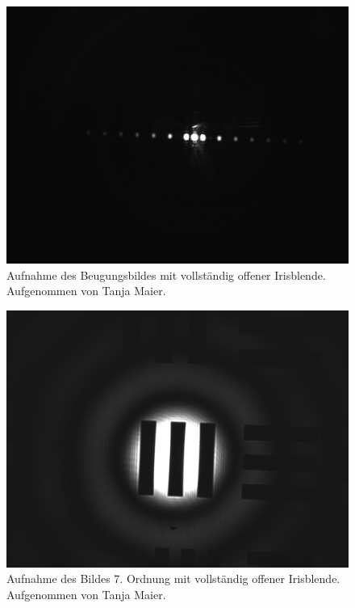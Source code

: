 \documentclass{article}
\begin{document}
\begin{minipage}[t]{.45\textwidth}
\begin{figure}[H]
\includegraphics[scale=0.1]{tm/Beugungsbild_voll.jpg}
\caption{Aufnahme des Beugungsbildes mit vollständig offener Irisblende. Aufgenommen von Tanja Maier.}
\label{fig:bbild_voll_tm}
\end{figure}
\end{minipage}
\hfill
\noindent
\begin{minipage}[t]{.45\textwidth}
\begin{figure}[H]
\includegraphics[scale=0.1]{tm/Bild_voll.jpg}
\caption{Aufnahme des Bildes 7. Ordnung mit vollständig offener Irisblende. Aufgenommen von Tanja Maier.}\label{fig:bild_voll_tm}
\end{figure}
\end{minipage}
\end{document}
